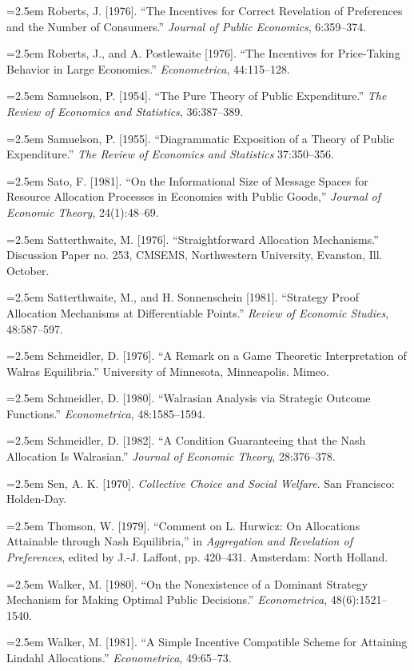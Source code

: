 \documentclass[12pt, letterpaper]{article}
\newcommand{\bibentry}[1]{\noindent\hangindent=2.5em\hangafter=1 \small #1 \par\vspace{0.7em}}
\begin{document}
\bibentry{Roberts, J. [1976]. ``The Incentives for Correct Revelation of Preferences and the Number of Consumers.'' \textit{Journal of Public Economics}, 6:359--374.}

\bibentry{Roberts, J., and A. Postlewaite [1976]. ``The Incentives for Price-Taking Behavior in Large Economies.'' \textit{Econometrica}, 44:115--128.}

\bibentry{Samuelson, P. [1954]. ``The Pure Theory of Public Expenditure.'' \textit{The Review of Economics and Statistics}, 36:387--389.}

\bibentry{Samuelson, P. [1955]. ``Diagrammatic Exposition of a Theory of Public Expenditure.'' \textit{The Review of Economics and Statistics} 37:350--356.}

\bibentry{Sato, F. [1981]. ``On the Informational Size of Message Spaces for Resource Allocation Processes in Economies with Public Goods,'' \textit{Journal of Economic Theory}, 24(1):48--69.}

\bibentry{Satterthwaite, M. [1976]. ``Straightforward Allocation Mechanisms.'' Discussion Paper no. 253, CMSEMS, Northwestern University, Evanston, Ill. October.}

\bibentry{Satterthwaite, M., and H. Sonnenschein [1981]. ``Strategy Proof Allocation Mechanisms at Differentiable Points.'' \textit{Review of Economic Studies}, 48:587--597.}

\bibentry{Schmeidler, D. [1976]. ``A Remark on a Game Theoretic Interpretation of Walras Equilibria.'' University of Minnesota, Minneapolis. Mimeo.}

\bibentry{Schmeidler, D. [1980]. ``Walrasian Analysis via Strategic Outcome Functions.'' \textit{Econometrica}, 48:1585--1594.}

\bibentry{Schmeidler, D. [1982]. ``A Condition Guaranteeing that the Nash Allocation Is Walrasian.'' \textit{Journal of Economic Theory}, 28:376--378.}


\bibentry{Sen, A. K. [1970]. \textit{Collective Choice and Social Welfare}. San Francisco: Holden-Day.}

\bibentry{Thomson, W. [1979]. ``Comment on L. Hurwicz: On Allocations Attainable through Nash Equilibria,'' in \textit{Aggregation and Revelation of Preferences}, edited by J.-J. Laffont, pp. 420--431. Amsterdam: North Holland.}

\bibentry{Walker, M. [1980]. ``On the Nonexistence of a Dominant Strategy Mechanism for Making Optimal Public Decisions.'' \textit{Econometrica}, 48(6):1521--1540.}

\bibentry{Walker, M. [1981]. ``A Simple Incentive Compatible Scheme for Attaining Lindahl Allocations.'' \textit{Econometrica}, 49:65--73.}
\end{document}
